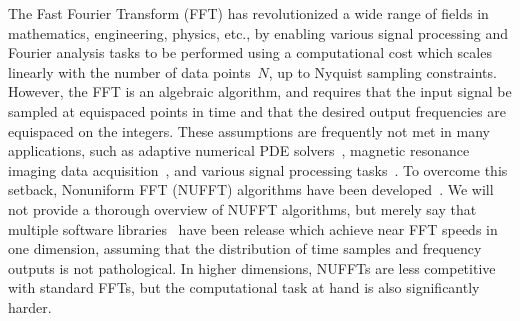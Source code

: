 
The Fast Fourier Transform (FFT) has revolutionized a wide range of fields in
mathematics, engineering, physics, etc., by enabling various signal processing
and Fourier analysis tasks to be performed using a computational cost which
scales linearly with the number of data points~$N$, up to Nyquist sampling
constraints. However, the FFT is an algebraic algorithm, and requires that the
input signal be sampled at equispaced points in time and that the desired output
frequencies are equispaced on the integers. These assumptions are frequently not
met in many applications, such as adaptive numerical PDE solvers~\cite{},
magnetic resonance imaging data acquisition~\cite{}, and various signal
processing tasks~\cite{}. To overcome this setback, Nonuniform FFT (NUFFT)
algorithms have been developed~\cite{}. We will not provide a thorough overview
of NUFFT algorithms, but merely say that multiple software libraries~\cite{}
have been release which achieve near FFT speeds in one dimension, assuming that
the distribution of time samples and frequency outputs is not pathological. In
higher dimensions, NUFFTs are less competitive with standard FFTs, but the
computational task at hand is also significantly harder.

